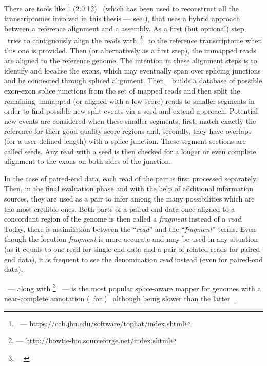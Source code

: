 There are tools like \toph\footnote{\toph\ ---
\href{https://ccb.jhu.edu/software/tophat/index.shtml}
{https://ccb.jhu.edu/software/tophat/index.shtml}} (2.0.12)~
(which has been used to reconstruct all the
transcriptomes involved in this thesis --- see ),
that uses a hybrid approach between a reference alignment and a 
assembly. As a first (but optional) step, \toph\ tries to contiguously
align the reads with \footnote{ ---
\href{http://bowtie-bio.sourceforge.net/index.shtml}%
{http://bowtie-bio.sourceforge.net/index.shtml}}~
to the reference transcriptome when this one is provided. Then
(or alternatively as a first step), the unmapped reads are aligned to the
reference genome. The intention in these alignment steps is to identify and
localise the exons, which may eventually span over splicing junctions and be
connected through spliced alignment. Then, \toph\ builds a database of
possible exon-exon splice junctions from the set of mapped reads and then split
the remaining unmapped (or aligned with a low score) reads to smaller segments
in order to find
possible new split events via a seed-and-extend approach. Potential new events
are considered when these smaller segments, first, match exactly the reference
for their good-quality score regions and, secondly, they have overlaps
(for a user-defined length) with a splice junction. These segment sections are
called seeds. Any read with a seed is then checked for a longer or even complete
alignment to the exons on both sides of the junction.\mybr\

In the case of paired-end data, each read of the pair is first processed
separately.
Then, in the final evaluation phase and
with the help of additional information sources,
they are used as a pair to infer among the many possibilities which
are the most credible ones.
Both parts of a paired-end data once aligned to a
concordant region of the genome is then called a \emph{fragment} instead of a
\emph{read}. Today, there is assimilation between the \enquote{\emph{read}}
and the \enquote{\emph{fragment}} terms. Even though the locution \emph{fragment}
is more accurate and may be used in any situation (as it equals to one read for
single-end data and a pair of related reads for paired-end data), it is
frequent to see the denomination \emph{read} instead (even for paired-end data).\mybr\

\toph\ ---
along with \footnote{ ---
}~ ---
is the most popular splice-aware mapper for genomes with a near-complete annotation
(\eg\ for )~
although being slower than the latter~.\mybr\



